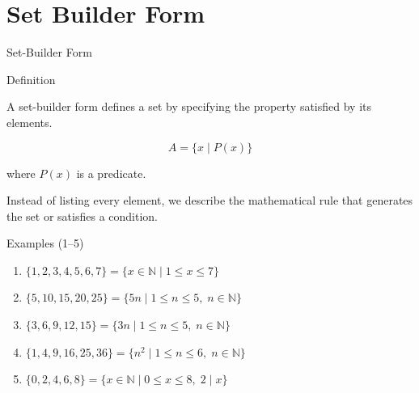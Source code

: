 \section{Set Builder Form}

\begin{frame}{Set-Builder Form}

\begin{block}{Definition}

\vspace{0.1cm}

A set-builder form defines a set by specifying the
property satisfied by its elements.

\[
A=\{x\mid P(x)\}
\]

where \(P(x)\) is a predicate.

\end{block}

\vspace{0.4cm}

Instead of listing every element, we describe the
mathematical rule that generates the set or satisfies a condition.

\end{frame}


\begin{frame}{Examples (1--5)}

\small

\begin{enumerate}

\item $\{1,2,3,4,5,6,7\}
      =\{x\in\mathbb N\mid1\le x\le7\}$

\vspace{0.35cm}

\item $\{5,10,15,20,25\}
      =\{5n\mid1\le n\le5,\;n\in\mathbb N\}$

\vspace{0.35cm}

\item $\{3,6,9,12,15\}
      =\{3n\mid1\le n\le5,\;n\in\mathbb N\}$

\vspace{0.35cm}

\item $\{1,4,9,16,25,36\}
      =\{n^2\mid1\le n\le6,\;n\in\mathbb N\}$

\vspace{0.35cm}

\item $\{0,2,4,6,8\}
      =\{x\in\mathbb N\mid0\le x\le8,\;2\mid x\}$

\end{enumerate}

\end{frame}

